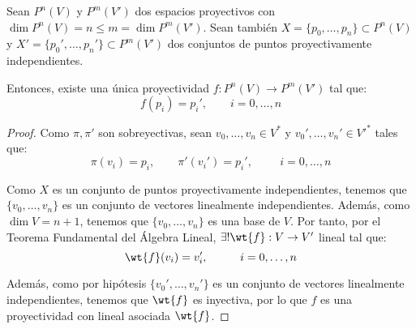 \begin{teo}
    Sean $P^n(V)$ y $P^m(V')$ dos espacios proyectivos con $\dim P^n(V) = n \leq m = \dim P^m(V')$.
    Sean también $X=\{p_0, \dots, p_n\}\subset P^n(V)$ y $X'=\{p_0', \dots, p_n'\}\subset P^m(V')$ dos conjuntos de puntos proyectivamente independientes.

    Entonces, existe una única proyectividad $f:P^n(V)\to P^m(V')$ tal que:
    \begin{equation*}
        f(p_i) = p_i',\qquad i=0,\dots,n
    \end{equation*}
\end{teo}
\begin{proof}
    Como $\pi,\pi'$ son sobreyectivas, sean $v_0,\dots,v_n\in V^\ast$ y $v_0',\dots,v_n'\in V'^\ast$ tales que:
    \begin{equation*}
        \pi(v_i) = p_i,\qquad \pi'(v_i') = p_i',\hspace{1cm} i=0,\dots,n
    \end{equation*}

    Como $X$ es un conjunto de puntos proyectivamente independientes, tenemos que $\{v_0,\dots,v_n\}$ es un conjunto de vectores linealmente independientes.
    Además, como $\dim V = n+1$, tenemos que $\{v_0,\dots,v_n\}$ es una base de $V$. Por tanto, por el Teorema Fundamental del Álgebra Lineal, $\exists! \wt{f}:V\to V'$ lineal tal que:
    \begin{equation*}
        \wt{f}(v_i) = v_i',\hspace{1cm} i=0,\dots,n
    \end{equation*}

    Además, como por hipótesis $\{v_0',\dots,v_n'\}$ es un conjunto de vectores linealmente independientes,
    tenemos que $\wt{f}$ es inyectiva, por lo que $f$ es una proyectividad con lineal asociada $\wt{f}$.

\end{proof}